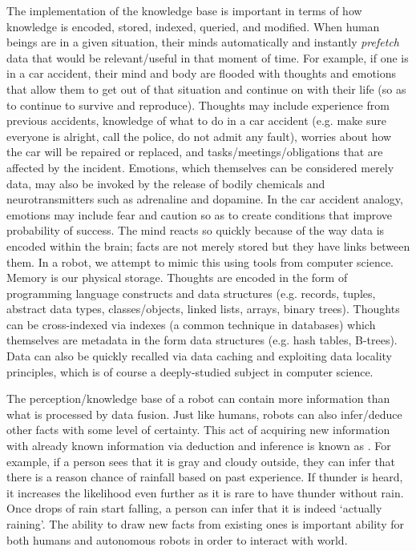 The implementation of the knowledge base is important in terms of how knowledge is encoded, stored, indexed, queried, and modified. When human beings are in a given situation, their minds automatically and instantly \textit{prefetch} data that would be relevant/useful in that moment of time. For example, if one is in a car accident, their mind and body are flooded with thoughts and emotions that allow them to get out of that situation and continue on with their life (so as to continue to survive and reproduce). Thoughts may include experience from previous accidents, knowledge of what to do in a car accident (e.g. make sure everyone is alright, call the police, do not admit any fault), worries about how the car will be repaired or replaced, and tasks/meetings/obligations that are affected by the incident. Emotions, which themselves can be considered merely data, may also be invoked by the release of bodily chemicals and neurotransmitters such as adrenaline and dopamine. In the car accident analogy, emotions may include fear and caution so as to create conditions that improve probability of success. The mind reacts so quickly because of the way data is encoded within the brain;  facts are not merely stored but they have links between them. In a robot, we attempt to mimic this using tools from computer science. Memory is our physical storage. Thoughts are encoded in the form of programming language constructs and data structures (e.g. records, tuples, abstract data types, classes/objects, linked lists, arrays, binary trees). Thoughts can be cross-indexed via indexes (a common technique in databases) which themselves are metadata in the form data structures (e.g. hash tables, B-trees). Data can also be quickly recalled via data caching and exploiting data locality principles, which is of course a deeply-studied subject in computer science.

The perception/knowledge base of a robot can contain more information than what is processed by data fusion. Just like humans, robots can also infer/deduce other facts with some level of certainty. This act of acquiring new information with already known information via deduction and inference is known as . For example, if a person sees that it is gray and cloudy outside, they can infer that there is a reason chance of rainfall based on past experience. If thunder is heard, it increases the likelihood even further as it is rare to have thunder without rain. Once drops of rain start falling, a person can infer that it is indeed `actually raining'.  The ability to draw new facts from existing ones is important ability for both humans and autonomous robots in order to interact with world.

